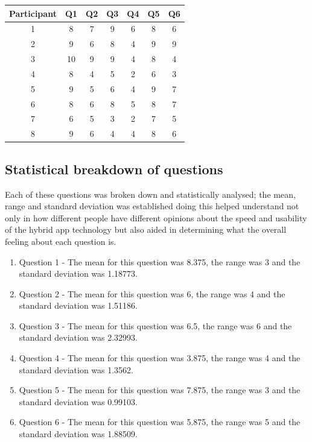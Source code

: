 \begin{center} 
 \begin{tabular}{||c c c c c c c||}  
 \hline
  \hline
 Participant & Q1 & Q2 & Q3 & Q4 & Q5 & Q6 \\
 \hline
 1 & 8 & 7 & 9 & 6 & 8 & 6 \\
 \hline
 2 & 9 & 6 & 8 & 4 & 9 & 9 \\
 \hline
 3 & 10 & 9 & 9 & 4 & 8 & 4 \\
 \hline
 4 & 8 & 4 & 5 & 2 & 6 & 3 \\
 \hline
 5 & 9 & 5 & 6 & 4 & 9 & 7 \\
 \hline
 6 & 8 & 6 & 8 & 5 & 8 & 7 \\
 \hline
 7 & 6 & 5 & 3 & 2 & 7 & 5 \\ 
 \hline
 8 & 9 & 6 & 4 & 4 & 8 & 6 \\
 \end{tabular}
 \end{center}

 \subsection{Statistical breakdown of questions}
 Each of these questions was broken down and statistically analysed; the mean, range and standard deviation was established doing this helped understand not only in how different people have different opinions about the speed and usability of the hybrid app technology but also aided in determining what the overall feeling about each question is.
 \begin{enumerate}
  \item Question 1 - The mean for this question was 8.375, the range was 3 and the standard deviation was 1.18773.
  \item Question 2 - The mean for this question was 6, the range was 4 and the standard deviation was 1.51186.
  \item Question 3 - The mean for this question was 6.5, the range was 6 and the standard deviation was 2.32993.
  \item Question 4 - The mean for this question was 3.875, the range was 4 and the standard deviation was 1.3562.
  \item Question 5 - The mean for this question was 7.875, the range was 3 and the standard deviation was 0.99103.
  \item Question 6 - The mean for this question was 5.875, the range was 5 and the standard deviation was 1.88509.
\end{enumerate}


